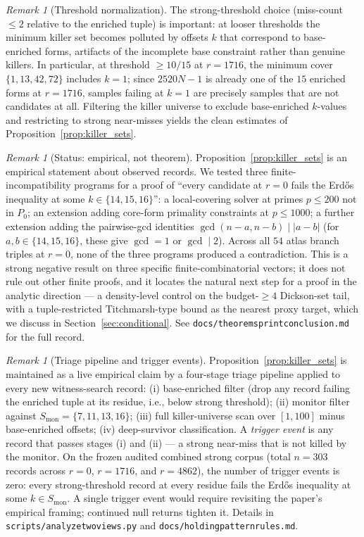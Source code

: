 \documentclass[11pt]{article}
\renewcommand{\_}{\origunderscore\allowbreak}
\theoremstyle{definition}
\theoremstyle{remark}
\newtheorem{remark}[theorem]{Remark}
\begin{document}
\begin{remark}[Threshold normalization]
The strong-threshold choice (miss-count $\le 2$ relative to the
enriched tuple) is important: at looser thresholds the minimum
killer set becomes polluted by offsets $k$ that correspond to
base-enriched forms, artifacts of the incomplete base constraint
rather than genuine killers. In particular, at threshold
$\ge 10/15$ at $r=1716$, the minimum cover $\{1,13,42,72\}$
includes $k=1$; since $2520N-1$ is already one of the $15$
enriched forms at $r=1716$, samples failing at $k=1$ are precisely
samples that are not candidates at all. Filtering the killer
universe to exclude base-enriched $k$-values and restricting to
strong near-misses yields the clean estimates of
Proposition~\ref{prop:killer_sets}.
\end{remark}

\begin{remark}[Status: empirical, not theorem]\label{rem:emp_only}
Proposition~\ref{prop:killer_sets} is an empirical statement about
observed records. We tested three finite-incompatibility programs
for a proof of ``every candidate at $r=0$ fails the Erd\H{o}s
inequality at some $k\in\{14,15,16\}$'': a local-covering solver
at primes $p\le 200$ not in $P_0$; an extension adding core-form
primality constraints at $p\le 1000$; a further extension adding
the pairwise-gcd identities
$\gcd(n-a,n-b)\mid |a-b|$ (for $a,b\in\{14,15,16\}$, these give
$\gcd=1$ or $\gcd\mid 2$). Across all $54$ atlas branch triples at
$r=0$, none of the three programs produced a contradiction. This
is a strong negative result on three specific finite-combinatorial
vectors; it does not rule out other finite proofs, and it locates
the natural next step for a proof in the analytic direction — a
density-level control on the budget-$\ge 4$ Dickson-set tail,
with a tuple-restricted Titchmarsh-type bound as the nearest
proxy target, which we discuss in
Section~\ref{sec:conditional}. See
\texttt{docs/theorem\_sprint\_conclusion.md} for the full record.
\end{remark}

\begin{remark}[Triage pipeline and trigger events]\label{rem:triage}
Proposition~\ref{prop:killer_sets} is maintained as a live empirical
claim by a four-stage triage pipeline applied to every new
witness-search record: (i) base-enriched filter (drop any record
failing the enriched tuple at its residue, i.e., below strong
threshold); (ii) monitor filter against $S_{\mathrm{mon}}=\{7,11,13,16\}$;
(iii) full killer-universe scan over $[1,100]$ minus base-enriched
offsets; (iv) deep-survivor classification. A \emph{trigger event} is
any record that passes stages (i) and (ii) — a strong near-miss
that is not killed by the monitor. On the frozen audited combined
strong corpus (total $n=303$ records across $r=0$, $r=1716$, and
$r=4862$), the number of trigger events is zero: every strong-threshold
record at every residue fails the Erd\H{o}s inequality at some
$k\in S_{\mathrm{mon}}$. A single trigger event would require revisiting
the paper's empirical framing; continued null returns tighten it.
Details in \texttt{scripts/analyze\_two\_views.py} and
\texttt{docs/holding\_pattern\_rules.md}.
\end{remark}
\end{document}
